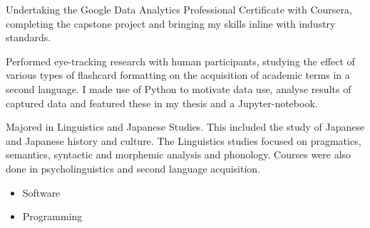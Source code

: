 \documentclass[10pt,a4paper,ragged2e,withhyper]{altacv}
\begin{document}
\begin{paracol}{2}
{}
\label{sec:orgbc68980}
Undertaking the Google Data Analytics Professional Certificate with Coursera, completing the capstone project and bringing my skills inline with industry standards.
\par\divider
{}
Performed eye-tracking research with human participants, studying the effect of various types of flashcard formatting on the acquisition of academic terms in a second language. I made use of Python to motivate data use, analyse results of captured data and featured these in my thesis and a Jupyter-notebook.
\par\divider
{}
Majored in Linguistics and Japanese Studies. This included the study of Japanese and Japanese history and culture. The Linguistics studies focused on pragmatics, semantics, syntactic and morphemic analysis and phonology. Courses were also done in psycholinguistics and second language acquisition.

\label{sec:org7bf12fc}
\begin{itemize}
\item Software
\end{itemize}
\begin{itemize}
\item Programming
\end{itemize}
\cvtag{\LaTeX}

\end{paracol}
\end{document}
